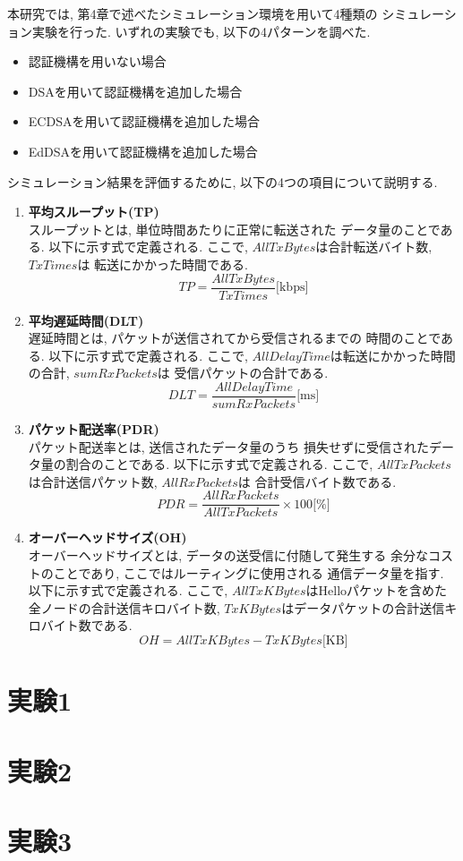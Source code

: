 本研究では, 第4章で述べたシミュレーション環境を用いて4種類の
シミュレーション実験を行った. いずれの実験でも, 以下の4パターンを調べた. 
\begin{itemize}
  \item 認証機構を用いない場合
  \item DSAを用いて認証機構を追加した場合
  \item ECDSAを用いて認証機構を追加した場合
  \item EdDSAを用いて認証機構を追加した場合
\end{itemize}
\indent シミュレーション結果を評価するために, 
以下の4つの項目について説明する. 
\begin{enumerate}
  \item \textbf{平均スループット(TP)}\\
  \indent スループットとは, 単位時間あたりに正常に転送された
  データ量のことである. 以下に示す式で定義される. ここで, 
  $AllTxBytes$は合計転送バイト数, $TxTimes$は
  転送にかかった時間である. \\
  \[
    TP = \frac{AllTxBytes}{TxTimes}\text{[kbps]}
  \]

  \item \textbf{平均遅延時間(DLT)}\\
  \indent 遅延時間とは, パケットが送信されてから受信されるまでの
  時間のことである. 以下に示す式で定義される. ここで,
  $AllDelayTime$は転送にかかった時間の合計, $sumRxPackets$は
  受信パケットの合計である. \\
  \[
    DLT = \frac{AllDelayTime}{sumRxPackets}\text{[ms]}
  \]

  \item \textbf{パケット配送率(PDR)}\\
  \indent パケット配送率とは, 送信されたデータ量のうち
  損失せずに受信されたデータ量の割合のことである. 以下に示す式で定義される. 
  ここで, $AllTxPackets$は合計送信パケット数, $AllRxPackets$は
  合計受信バイト数である. \\
  \[
    PDR = \frac{AllRxPackets}{AllTxPackets} \times 100 \text{[\%]}
  \]

  \item \textbf{オーバーヘッドサイズ(OH)}\\
  \indent オーバーヘッドサイズとは, データの送受信に付随して発生する
  余分なコストのことであり, ここではルーティングに使用される
  通信データ量を指す. 以下に示す式で定義される. ここで, 
  $AllTxKBytes$はHelloパケットを含めた全ノードの合計送信キロバイト数, 
  $TxKBytes$はデータパケットの合計送信キロバイト数である. \\
  \[
    OH = AllTxKBytes - TxKBytes \text{[KB]}
  \]
\end{enumerate}


\section{実験1}

\section{実験2}

\section{実験3}
